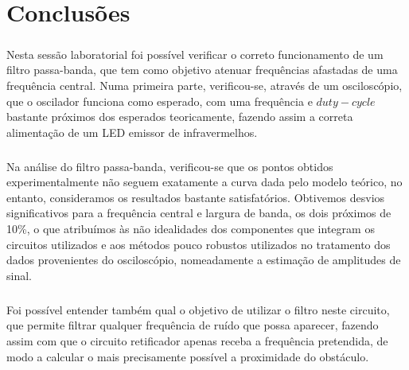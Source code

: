 \documentclass[a4paper,11pt]{report}
\begin{document}
\chapter{Conclusões}

\paragraph{}Nesta sessão laboratorial foi possível verificar o correto funcionamento de um filtro passa-banda, que tem como objetivo atenuar frequências afastadas de uma frequência central. Numa primeira parte, verificou-se, através de um osciloscópio, que o oscilador funciona como esperado, com uma frequência e $duty-cycle$ bastante próximos dos esperados teoricamente, fazendo assim a correta alimentação de um LED emissor de infravermelhos.

\paragraph{}
Na análise do filtro passa-banda, verificou-se que os pontos obtidos experimentalmente não seguem exatamente a curva dada pelo modelo teórico, no entanto, consideramos os resultados bastante satisfatórios. Obtivemos desvios significativos para a frequência central e largura de banda, os dois próximos de 10\%, o que atribuímos às não idealidades dos componentes que integram os circuitos utilizados e aos métodos pouco robustos utilizados no tratamento dos dados provenientes do osciloscópio, nomeadamente a estimação de amplitudes de sinal.

\paragraph{}
Foi possível entender também qual o objetivo de utilizar o filtro neste circuito, que permite filtrar qualquer frequência de ruído que possa aparecer, fazendo assim com que o circuito retificador apenas receba a frequência pretendida, de modo a calcular o mais precisamente possível a proximidade do obstáculo.
\end{document}
